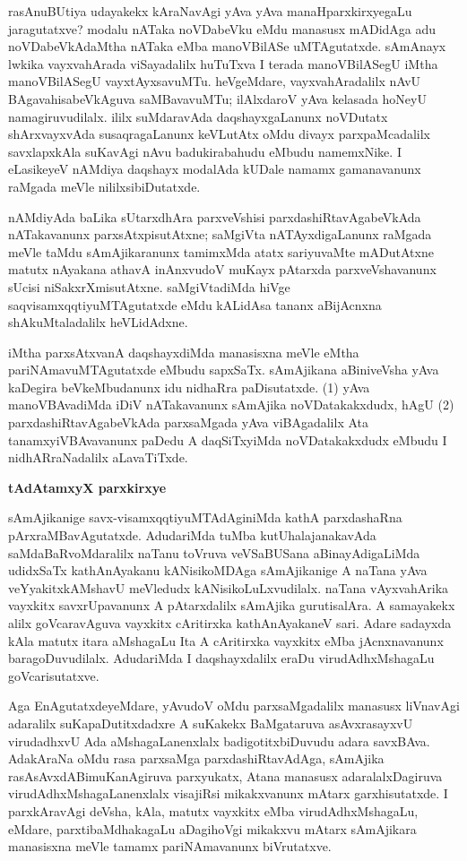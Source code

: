 rasAnuBUtiya udayakekx kAraNavAgi yAva yAva manaHparxkirxyegaLu jaragu\-tatxve? modalu nATaka noVDabeVku eMdu manasusx mADidAga adu noVDabeVkA\-daMtha nATaka eMba manoVBilASe uMTAgutatxde. sAmAnayx lwkika vayxvahArada viSayadalilx huTuTxva I terada manoVBilASegU iMtha manoVBilASegU vayxtAyxsa\-vuMTu. heVgeMdare, vayxvahAradalilx nAvU BAgavahisabeVkAguva saMBavavuMTu; ilAlxdaroV yAva kelasada hoNeyU namagiruvudilalx. ililx suMdaravAda daqshayxgaLanunx noVDutatx shArxvayxvAda susaqragaLanunx keVLutAtx oMdu divayx parxpaMcadalilx savxlapxkAla suKavAgi nAvu badukirabahudu eMbudu namemxNike. I eLasikeyeV nAMdiya daqshayx modalAda kUDale namamx gamanavanunx raMgada meVle nililxsibiDutatxde.

nAMdiyAda baLika sUtarxdhAra parxveVshisi parxdashiRtavAgabeVkAda nATakavanunx parxsAtxpisutAtxne; saMgiVta nATAyxdigaLanunx raMgada meVle taMdu sAmAjikaranunx tamimxMda atatx sariyuvaMte mADutAtxne matutx nAyakana athavA inAnxvudoV muKayx pAtarxda parxveVshavanunx sUcisi niSakxrXmisutAtxne. saMgiVtadiMda hiVge saqvisamxqqtiyuMTAgutatxde eMdu kALidAsa tananx aBijAcnxna shAkuMtaladalilx heVLidAdxne.

iMtha parxsAtxvanA daqshayxdiMda manasisxna meVle eMtha pariNAmavuMTAgutatxde eMbudu sapxSaTx. sAmAjikana aBiniveVsha yAva kaDegira beVkeMbudanunx idu nidhaRra paDisutatxde. (1) yAva manoVBAvadiMda iDiV nATakavanunx sAmAjika noVDatakakxdudx, hAgU (2) parxdashiRtavAgabeVkAda parxsaMgada yAva viBAgadalilx Ata tanamxyiVBAvavanunx paDedu A daqSiTxyiMda noVDatakakxdudx eMbudu I nidhARraNadalilx aLavaTiTxde.

\bigskip
\begin{center}
{\Large\bf tAdAtamxyX parxkirxye}
\end{center}

sAmAjikanige savx-visamxqqtiyuMTAdAginiMda kathA parxdashaRna pArxraMBavAgutatxde. AdudariMda tuMba kutUhalajanakavAda saMdaBaRvoMdaralilx naTanu toVruva veVSa\-BUSana aBinayAdigaLiMda udidxSaTx kathAnAyakanu kANisikoMDAga sAmAjikanige A naTana yAva veYyakitxkAMshavU meVledudx kANisikoLuLxvudilalx. naTana vAyxvahArika vayxkitx savxrUpavanunx A pAtarxdalilx sAmAjika gurutisalAra. A samayakekx alilx goVcaravAguva vayxkitx cAritirxka kathAnAyakaneV sari. Adare sadayxda kAla matutx itara aMshagaLu Ita A cAritirxka vayxkitx eMba jAcnxnavanunx baragoDuvudilalx. AdudariMda I daqshayxdalilx eraDu virudAdhxMshagaLu goVcarisutatxve.

Aga EnAgutatxdeyeMdare, yAvudoV oMdu parxsaMgadalilx manasusx liVnavAgi adaralilx suKapaDutitxdadxre A suKakekx BaMgataruva asAvxrasayxvU virudadhxvU Ada aMshagaLanenxlalx badigotitxbiDuvudu adara savxBAva. AdakAraNa oMdu rasa parxsaMga parxdashiRtavAdAga, sAmAjika rasAsAvxdABimuKanAgiruva parxyukatx, Atana manasusx adaralalxDagiruva virudAdhxMshagaLanenxlalx visajiRsi mikakxvanunx mAtarx garxhisutatxde. I parxkAravAgi deVsha, kAla, matutx vayxkitx eMba virudAdhxMshagaLu, eMdare, parxtibaMdhakagaLu aDagihoVgi mikakxvu mAtarx sAmAjikara manasisxna meVle tamamx pariNAmavanunx biVrutatxve.

